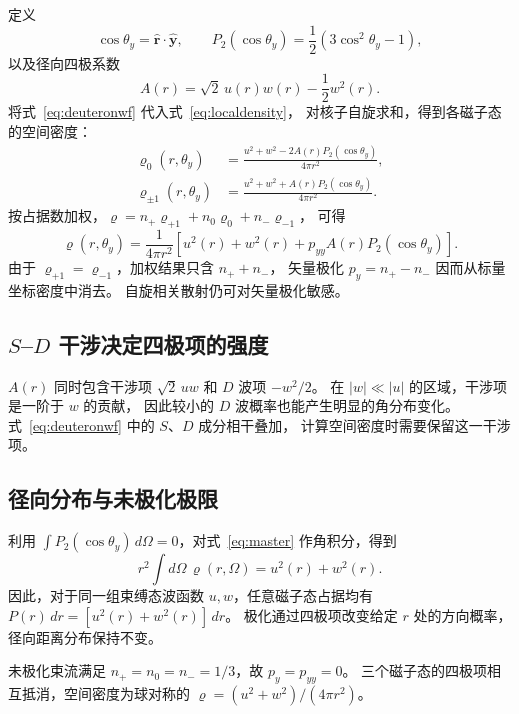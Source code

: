 \documentclass[11pt,a4paper]{ctexart}
\begin{document}
定义
\[
\cos\theta_y=\hat{\bm r}\cdot\hat{\bm y},
\qquad P_2(\cos\theta_y)=\frac12(3\cos^2\theta_y-1),
\]
以及径向四极系数
\begin{equation}
A(r)=\sqrt2\,u(r)w(r)-\frac12w^2(r).
\label{eq:A}
\end{equation}
将式~\eqref{eq:deuteronwf} 代入式~\eqref{eq:localdensity}，
对核子自旋求和，得到各磁子态的空间密度：
\begin{align}
\varrho_0(r,\theta_y)
&=\frac{u^2+w^2-2A(r)P_2(\cos\theta_y)}{4\pi r^2},
\label{eq:rho0}\\
\varrho_{\pm1}(r,\theta_y)
&=\frac{u^2+w^2+A(r)P_2(\cos\theta_y)}{4\pi r^2}.
\label{eq:rhopm}
\end{align}
按占据数加权，$\varrho=n_+\varrho_{+1}+n_0\varrho_0+n_-\varrho_{-1}$，
可得
\begin{equation}
\boxed{
\varrho(r,\theta_y)
=\frac{1}{4\pi r^2}
\left[u^2(r)+w^2(r)+p_{yy}A(r)P_2(\cos\theta_y)\right].
}
\label{eq:master}
\end{equation}
由于 $\varrho_{+1}=\varrho_{-1}$，加权结果只含 $n_++n_-$，
矢量极化 $p_y=n_+-n_-$ 因而从标量坐标密度中消去。
自旋相关散射仍可对矢量极化敏感。

\subsection{\texorpdfstring{$S$--$D$}{S--D} 干涉决定四极项的强度}

$A(r)$ 同时包含干涉项 $\sqrt2\,uw$ 和 $D$ 波项 $-w^2/2$。
在 $|w|\ll|u|$ 的区域，干涉项是一阶于 $w$ 的贡献，
因此较小的 $D$ 波概率也能产生明显的角分布变化。
式~\eqref{eq:deuteronwf} 中的 $S$、$D$ 成分相干叠加，
计算空间密度时需要保留这一干涉项。

\subsection{径向分布与未极化极限}

利用 $\int P_2(\cos\theta_y)\,d\Omega=0$，对式~\eqref{eq:master} 作角积分，得到
\begin{equation}
r^2\int d\Omega\,\varrho(r,\Omega)=u^2(r)+w^2(r).
\label{eq:radial}
\end{equation}
因此，对于同一组束缚态波函数 $u,w$，任意磁子态占据均有
$P(r)\,dr=[u^2(r)+w^2(r)]\,dr$。
极化通过四极项改变给定 $r$ 处的方向概率，径向距离分布保持不变。

未极化束流满足 $n_+=n_0=n_-=1/3$，故 $p_y=p_{yy}=0$。
三个磁子态的四极项相互抵消，空间密度为球对称的
$\varrho=(u^2+w^2)/(4\pi r^2)$。
\end{document}
